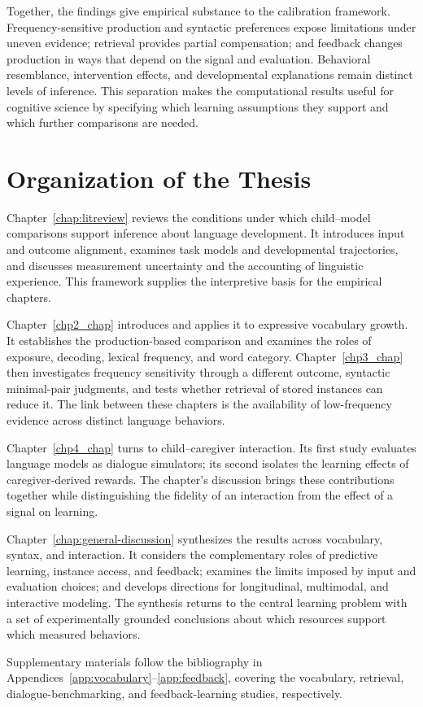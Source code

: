 Together, the findings give empirical substance to the calibration framework. Frequency-sensitive production and syntactic preferences expose limitations under uneven evidence; retrieval provides partial compensation; and feedback changes production in ways that depend on the signal and evaluation. Behavioral resemblance, intervention effects, and developmental explanations remain distinct levels of inference. This separation makes the computational results useful for cognitive science by specifying which learning assumptions they support and which further comparisons are needed.

\section{Organization of the Thesis}
\label{sec:intro:organization}

Chapter~\ref{chap:litreview} reviews the conditions under which child--model comparisons support inference about language development. It introduces input and outcome alignment, examines task models and developmental trajectories, and discusses measurement uncertainty and the accounting of linguistic experience. This framework supplies the interpretive basis for the empirical chapters.

Chapter~\ref{chp2_chap} introduces \meCDI{} and applies it to expressive vocabulary growth. It establishes the production-based comparison and examines the roles of exposure, decoding, lexical frequency, and word category. Chapter~\ref{chp3_chap} then investigates frequency sensitivity through a different outcome, syntactic minimal-pair judgments, and tests whether retrieval of stored instances can reduce it. The link between these chapters is the availability of low-frequency evidence across distinct language behaviors.

Chapter~\ref{chp4_chap} turns to child--caregiver interaction. Its first study evaluates language models as dialogue simulators; its second isolates the learning effects of caregiver-derived rewards. The chapter's discussion brings these contributions together while distinguishing the fidelity of an interaction from the effect of a signal on learning.

Chapter~\ref{chap:general-discussion} synthesizes the results across vocabulary, syntax, and interaction. It considers the complementary roles of predictive learning, instance access, and feedback; examines the limits imposed by input and evaluation choices; and develops directions for longitudinal, multimodal, and interactive modeling. The synthesis returns to the central learning problem with a set of experimentally grounded conclusions about which resources support which measured behaviors.

Supplementary materials follow the bibliography in Appendices~\ref{app:vocabulary}--\ref{app:feedback}, covering the vocabulary, retrieval, dialogue-benchmarking, and feedback-learning studies, respectively.
